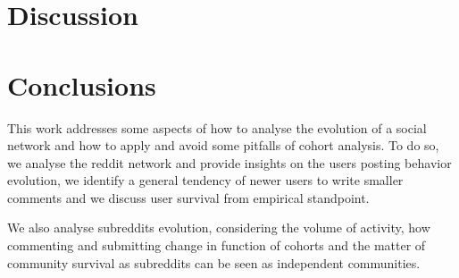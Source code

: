 \section{Discussion}

\section{Conclusions}

This work addresses some aspects of how to analyse the evolution of a social network and how to apply and avoid some pitfalls of cohort analysis. To do so, we analyse the reddit network and provide insights on the users posting behavior evolution, we identify a general tendency of newer users to write smaller comments and we discuss user survival from empirical standpoint. 

We also analyse subreddits evolution, considering the volume of activity, how commenting and submitting change in function of cohorts and the matter of community survival as subreddits can be seen as independent communities.
